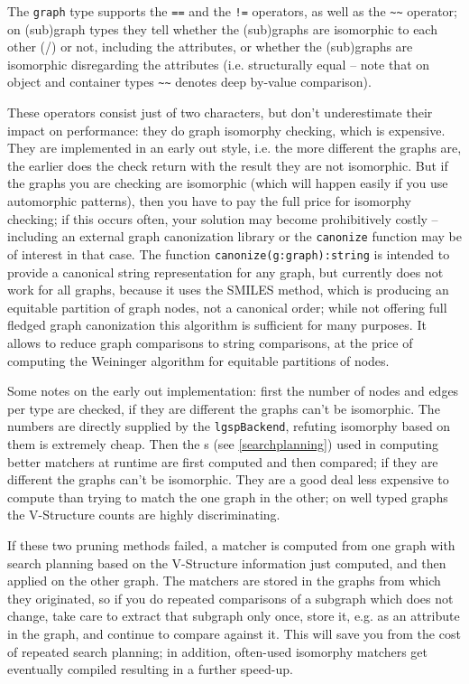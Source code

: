 The \texttt{graph} type supports the \texttt{==} and the \texttt{!=} operators, as well as the \texttt{\textasciitilde\textasciitilde} operator;
on (sub)graph types they tell whether the (sub)graphs are isomorphic to each other (/) or not, including the attributes, or whether the (sub)graphs are isomorphic disregarding the attributes (i.e. structurally equal -- note that on object and container types \texttt{\textasciitilde\textasciitilde} denotes deep by-value comparison).

These operators consist just of two characters, but don't underestimate their impact on performance:
they do graph isomorphy checking, which is expensive.
They are implemented in an early out style, i.e. the more different the graphs are, the earlier does the check return with the result they are not isomorphic.
But if the graphs you are checking are isomorphic (which will happen easily if you use automorphic patterns), then you have to pay the full price for isomorphy checking; if this occurs often, your solution may become prohibitively costly -- including an external graph canonization library or the \texttt{canonize} function may be of interest in that case.
The function \texttt{canonize(g:graph):string} is intended to provide a canonical string representation for any graph, but currently does not work for all graphs, because it uses the SMILES\cite{SMILES} method, which is producing an equitable partition of graph nodes, not a canonical order; while not offering full fledged graph canonization this algorithm is sufficient for many purposes.
It allows to reduce graph comparisons to string comparisons, at the price of computing the Weininger algorithm for equitable partitions of nodes.

Some notes on the early out implementation: first the number of nodes and edges per type are checked, if they are different the graphs can't be isomorphic. The numbers are directly supplied by the \texttt{lgspBackend}, refuting isomorphy based on them is extremely cheap.
Then the s (see \ref{searchplanning}) used in computing better matchers at runtime are first computed and then compared; if they are different the graphs can't be isomorphic. They are a good deal less expensive to compute than trying to match the one graph in the other; on well typed graphs the V-Structure counts are highly discriminating.

If these two pruning methods failed, a matcher is computed from one graph with search planning based on the V-Structure information just computed, and then applied on the other graph.
The matchers are stored in the graphs from which they originated, so if you do repeated comparisons of a subgraph which does not change, take care to extract that subgraph only once, store it, e.g. as an attribute in the graph, and continue to compare against it. 
This will save you from the cost of repeated search planning; in addition, often-used isomorphy matchers get eventually compiled resulting in a further speed-up.

